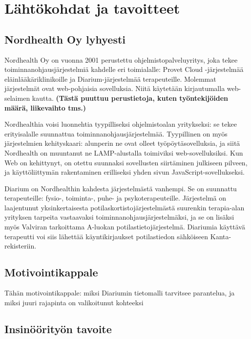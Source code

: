 \hypertarget{luxe4htuxf6kohdat-ja-tavoitteet}{%
\chapter{Lähtökohdat ja
tavoitteet}\label{luxe4htuxf6kohdat-ja-tavoitteet}}

\hypertarget{nordhealth-oy-lyhyesti}{%
\section{Nordhealth Oy lyhyesti}\label{nordhealth-oy-lyhyesti}}

Nordhealth Oy on vuonna 2001 perustettu ohjelmistopalveluyritys, joka
tekee toiminnanohjausjärjestelmiä kahdelle eri toimialalle: Provet Cloud
-järjestelmää eläinlääkäriklinikoille ja Diarium-järjestelmää
terapeuteille. Molemmat järjestelmät ovat web-pohjaisia sovelluksia.
Niitä käytetään kirjautumalla web-selaimen kautta. \textbf{(Tästä
puuttuu perustietoja, kuten työntekijöiden määrä, liikevaihto tms.)}

Nordhealthia voisi luonnehtia tyypilliseksi ohjelmistoalan yritykseksi:
se tekee erityisalalle suunnattua toiminnanohjausjärjestelmää.
Tyypillinen on myös järjestelmien kehityskaari: alunperin ne ovat olleet
työpöytäsovelluksia, ja siitä Nordhealth on muuntanut ne LAMP-alustalla
toimiviksi web-sovelluksiksi. Kun Web on kehittynyt, on otettu suunnaksi
sovellusten siirtäminen julkiseen pilveen, ja käyttöliittymän
rakentaminen erilliseksi yhden sivun JavaScript-sovellukseksi.

Diarium on Nordhealthin kahdesta järjestelmästä vanhempi. Se on
suunnattu terapeuteille: fysio-, toiminta-, puhe- ja psykoterapeuteille.
Järjestelmä on laajentunut yksinkertaisesta
potilaskortistojärjestelmästä suurenkin terapia-alan yrityksen tarpeita
vastaavaksi toiminnanohjausjärjestelmäksi, ja se on lisäksi myös
Valviran tarkoittama A-luokan potilastietojärjestelmä. Diariumia
käyttävä terapeutti voi siis lähettää käyntikirjaukset potilastiedon
sähköiseen Kanta-rekisteriin.

\hypertarget{motivointikappale}{%
\section{Motivointikappale}\label{motivointikappale}}

Tähän motivointikappale: miksi Diariumin tietomalli tarvitsee
parantelua, ja miksi juuri rajapinta on valikoitunut kohteeksi

\hypertarget{insinuxf6uxf6rityuxf6n-tavoite}{%
\section{Insinöörityön tavoite}\label{insinuxf6uxf6rityuxf6n-tavoite}}

